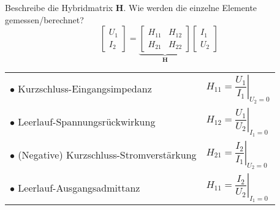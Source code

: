 \begin{karte}{Beschreibe die Hybridmatrix $\mathbf{H}$. Wie werden die einzelne Elemente gemessen/berechnet?\\
		\begin{equation*}
		\left[\begin{array}{c}
		U_1 \\ I_2
		\end{array}\right]
		= 
		\underbrace{\left[\begin{array}{cc}
			H_{11} & H_{12}\\
			H_{21} & H_{22}
			\end{array}\right]}_{\mathbf{H}}
		\left[\begin{array}{c}
		I_1 \\ U_2
		\end{array}\right]
		\end{equation*}}
	\renewcommand*{\arraystretch}{2.2}
	{\small 
	\begin{tabular}{ll}	
		$\bullet$ Kurzschluss-Eingangsimpedanz & $H_{11} = \left.\dfrac{U_1}{I_1}\right|_{U_2=0}$\\
		$\bullet$ Leerlauf-Spannungsrückwirkung & $H_{12} = \left.\dfrac{U_1}{U_2}\right|_{I_1=0}$\\
		$\bullet$ (Negative) Kurzschluss-Stromverstärkung & $H_{21} = \left.\dfrac{I_2}{I_1}\right|_{U_2=0}$\\
		$\bullet$ Leerlauf-Ausgangsadmittanz & $H_{11} = \left.\dfrac{I_2}{U_2}\right|_{I_1=0}$\\
	\end{tabular}
	}
\end{karte}
